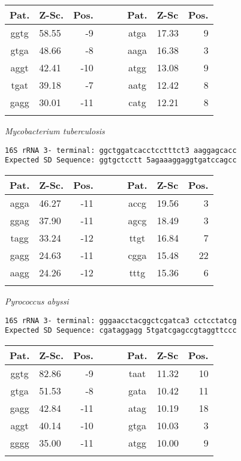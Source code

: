 \noindent
\begin{center}
\begin{tabular}{clrcclr}
Pat. & Z-Sc. & Pos. & \verb+   + & Pat. & Z-Sc & Pos. \\
\hline
ggtg & 58.55 & -9 &  & atga & 17.33 & 9 \\
gtga & 48.66 & -8 &  & aaga & 16.38 & 3 \\
aggt & 42.41 & -10 &  & atgg & 13.08 & 9 \\
tgat & 39.18 & -7 &  & aatg & 12.42 & 8 \\
gagg & 30.01 & -11 &  & catg & 12.21 & 8 \\
    &     \\
\end{tabular}
\end{center}

\vspace{1em}
\noindent
{\it Mycobacterium tuberculosis    }
\begin{verbatim}
16S rRNA 3- terminal: ggctggatcacctcctttct3 aaggagcacc
Expected SD Sequence: ggtgctcctt 5agaaaggaggtgatccagcc
\end{verbatim}

\noindent
\begin{center}
\begin{tabular}{clrcclr}
Pat. & Z-Sc. & Pos. & \verb+   + & Pat. & Z-Sc & Pos. \\
\hline
agga & 46.27 & -11 &  & accg & 19.56 & 3 \\
ggag & 37.90 & -11 &  & agcg & 18.49 & 3 \\
tagg & 33.24 & -12 &  & ttgt & 16.84 & 7 \\
gagg & 24.63 & -11 &  & cgga & 15.48 & 22 \\
aagg & 24.26 & -12 &  & tttg & 15.36 & 6 \\
    &     \\
\end{tabular}
\end{center}

\vspace{1em}
\noindent
{\it Pyrococcus abyssi    }
\begin{verbatim}
16S rRNA 3- terminal: gggaacctacggctcgatca3 cctcctatcg
Expected SD Sequence: cgataggagg 5tgatcgagccgtaggttccc
\end{verbatim}

\noindent
\begin{center}
\begin{tabular}{clrcclr}
Pat. & Z-Sc. & Pos. & \verb+   + & Pat. & Z-Sc & Pos. \\
\hline
ggtg & 82.86 & -9 &  & taat & 11.32 & 10 \\
gtga & 51.53 & -8 &  & gata & 10.42 & 11 \\
gagg & 42.84 & -11 &  & atag & 10.19 & 18 \\
aggt & 40.14 & -10 &  & gtga & 10.03 & 3 \\
gggg & 35.00 & -11 &  & atgg & 10.00 & 9 \\
    &     \\
\end{tabular}
\end{center}

